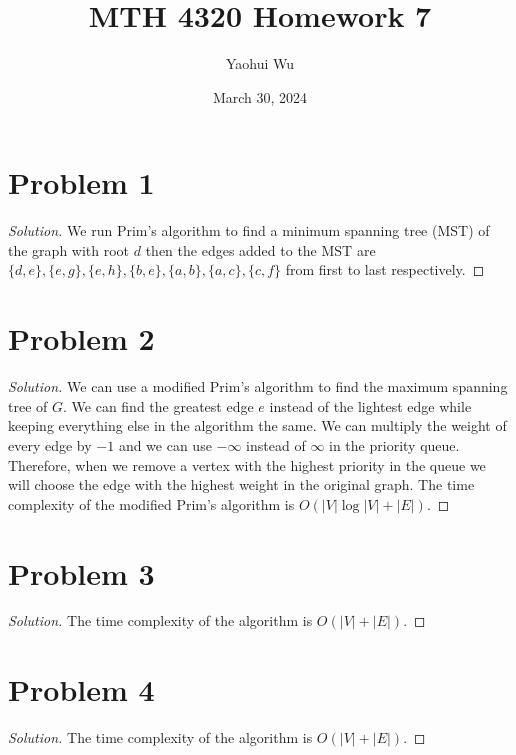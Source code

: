 \documentclass[12pt]{article}
\title{MTH 4320 Homework 7}
\author{Yaohui Wu}
\date{March 30, 2024}
\newenvironment*{solution}{\begin{proof}[Solution]}{\end{proof}}
\begin{document}
\maketitle
\section*{Problem 1}
\begin{solution}
    We run Prim's algorithm to find a minimum spanning tree (MST) of the graph
    with root \(d\) then the edges added to the MST are \(\{d,e\},\{e,g\},\{e,
    h\},\{b,e\},\{a,b\},\{a,c\},\{c,f\}\) from first to last respectively.
\end{solution}
\section*{Problem 2}
\begin{solution}
    We can use a modified Prim's algorithm to find the maximum spanning tree
    of \(G\). We can find the greatest edge \(e\) instead of the lightest edge
    while keeping everything else in the algorithm the same. We can multiply
    the weight of every edge by \(-1\) and we can use \(-\infty\) instead of
    \(\infty\) in the priority queue. Therefore, when we remove a vertex with
    the highest priority in the queue we will choose the edge with the highest
    weight in the original graph. The time complexity of the modified Prim's
    algorithm is \(O(|V|\log|V|+|E|)\).
\end{solution}
\section*{Problem 3}
\begin{solution}
    The time complexity of the algorithm is \(O(|V|+|E|)\).
\end{solution}
\section*{Problem 4}
\begin{solution}
    The time complexity of the algorithm is \(O(|V|+|E|)\).
\end{solution}
\end{document}
